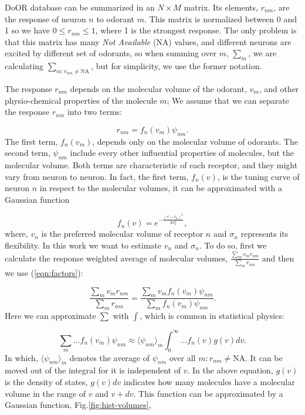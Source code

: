 \documentclass[11pt]{article} %
\begin{document}
DoOR database can be summarized in an $N\times M$ matrix. 
Its elements, $r_{nm}$, are the response of neuron $n$ to odorant $m$. 
This matrix is normalized between 0 and 1 so we have $0 \le r_{nm} \le 1$, where 1 is the strongest response.
The only problem is that this matrix has many {\it Not Available} (NA) values, 
and different neurons are excited by different set of odorants, 
so  when summing over $m$, $\sum_m$, we are calculating $\sum_{m: r_{nm} \neq \text{NA}}$, 
but for simplicity, 
we use the former notation. 

The response $r_{nm}$ depends on the molecular volume of the odorant, $v_m$, 
and other physio-chemical properties of the molecule $m$; 
We assume that we can separate the response $r_{nm}$ into two terms:

\begin{equation}
	r_{nm} = f_n(v_m) \psi_{nm}.
	\label{eqn:factors}
\end{equation}
The first term, $f_n(v_m)$, depends only on the molecular volume of odorants.
The second term, $\psi_{nm}$ include every other influential properties of molecules, but the molecular volume.
Both terms are characteristic of each receptor, and they might vary from neuron to neuron.
In fact, the first term, $f_n(v)$, is the tuning curve of neuron $n$ in respect to the molecular volumes, 
it can be approximated with a Gaussian function

\begin{equation}
	\displaystyle f_n(v) = e^{-\frac{(v-v_n)^2}{2\sigma^2_n}}, 
	\label{eqn:volume-dependence}
\end{equation}
where, $v_n$ is the preferred molecular volume of receptor $n$ and $\sigma_n$ represents its flexibility. 
In this work we want to estimate $v_n$ and $\sigma_n$. 
To do so, first we calculate the response weighted average of molecular volumes, 
$\frac{\sum_{m} v_m r_{nm}}{\sum_{m} r_{nm}}$ and then we use (\ref{eqn:factors}):

\begin{equation}
	\frac{\displaystyle \sum_{m} v_m r_{nm}}{\displaystyle \sum_{m} r_{nm}} = \frac{\displaystyle \sum_{m} v_m f_n(v_m) \psi_{nm}}{\displaystyle \sum_{m} f_n(v_m) \psi_{nm}}.
	\label{eqn:sta}
\end{equation}
Here we can approximate $\sum$ with $\int$, which is common in statistical physics:

\begin{equation}
	\sum_{m} \dots f_n(v_m) \psi_{nm} \approx  \langle \psi_{nm} \rangle_m \int_0^\infty \dots f_n(v) g(v)  dv. 
	\label{eqn:sigma_to_int}
\end{equation}
In which, 
$\langle \psi_{nm} \rangle_m$ denotes the average of $\psi_{nm}$ over all $m: r_{nm} \neq \text{NA}$. 
It can be moved out of the integral for it is independent of $v$.
In the above equation, 
$g(v)$ is the density of states, $g(v) dv$ indicates how many molecules have a molecular volume in the range of $v$ and $v+dv$.
This function can be approximated by a Gaussian function, Fig.\ref{fig:hist-volumes}, 
\end{document}
